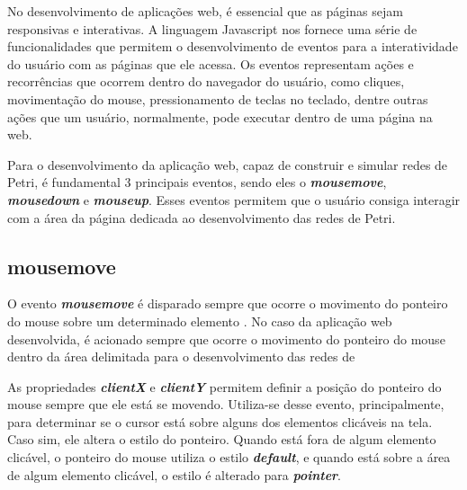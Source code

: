 \documentclass[
	12pt,				%
	openright,			%
	oneside,			%
	a4paper,			%
	english,			%
	brazil				%
	]{abntex2}
\begin{document}
No desenvolvimento de aplicações web, é essencial que as páginas sejam responsivas e interativas. A linguagem Javascript nos fornece uma série de funcionalidades que permitem o desenvolvimento de eventos para a interatividade do usuário com as páginas que ele acessa. Os eventos representam ações e recorrências que ocorrem dentro do navegador do usuário, como cliques, movimentação do mouse, pressionamento de teclas no teclado, dentre outras ações que um usuário, normalmente, pode executar dentro de uma página na web. 

Para o desenvolvimento da aplicação web, capaz de construir e simular redes de Petri, é fundamental 3 principais eventos, sendo eles o \textbf{\textit{mousemove}}, \textbf{\textit{mousedown}} e \textbf{\textit{mouseup}}. Esses eventos permitem que o usuário consiga interagir com a área da página dedicada ao desenvolvimento das redes de Petri. 

\subsection*{mousemove}\label{cap:mousemove}

O evento \textbf{\textit{mousemove}} é disparado sempre que ocorre o movimento do ponteiro do mouse sobre um determinado elemento \cite{mdn_mousemove_event}. No caso da aplicação web desenvolvida, é acionado sempre que ocorre o movimento do ponteiro do mouse dentro da área delimitada para o desenvolvimento das redes de 



As propriedades \textbf{\textit{clientX}} e \textbf{\textit{clientY}} permitem definir a posição do ponteiro do mouse sempre que ele está se movendo. Utiliza-se desse evento, principalmente, para determinar se o cursor está sobre alguns dos elementos clicáveis na tela. Caso sim, ele altera o estilo do ponteiro. Quando está fora de algum elemento clicável, o ponteiro do mouse utiliza o estilo \textbf{\textit{default}}, e quando está sobre a área de algum elemento clicável, o estilo é alterado para \textbf{\textit{pointer}}.
\end{document}
